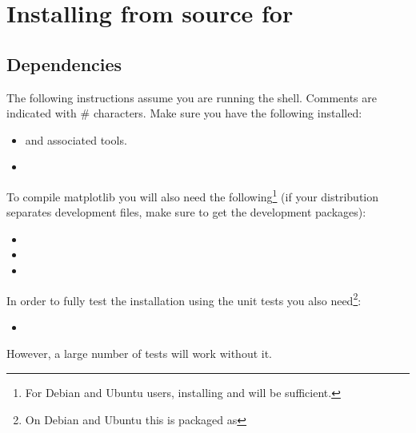 %
%
%

\section{Installing from source for \linux}
\label{sec:srclinux}

\subsection{Dependencies}

The following instructions assume you are running the  shell.
Comments are indicated with \# characters.
Make sure you have the following installed:
\begin{itemize}
 \item {} and associated tools.
 \item {}
\end{itemize}

\noindent To compile matplotlib you will also need the following\footnote{For
Debian and Ubuntu users, installing  and
 will be sufficient.} (if your distribution separates
development files, make sure to get the development packages):
\begin{itemize}
 \item {}
 \item {}
 \item {}
\end{itemize}

\noindent In order to fully test the installation using the unit tests you also
need\footnote{On Debian and Ubuntu this is packaged as }:
\begin{itemize}
 \item {}
\end{itemize}
However, a large number of tests will work without it.

